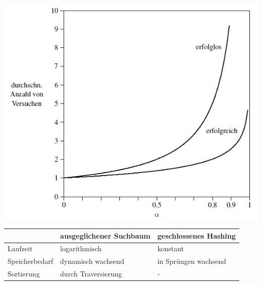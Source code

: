 \documentclass{beamer}
\begin{document}
\begin{frame}[fragile]
\includegraphics[scale=0.5]{bild4.png}  

\begin{tabular}{lll}
& ausgeglichener Suchbaum & geschlossenes Hashing  \\ 
\hline
Laufzeit  & logarithmisch & konstant \\ 
Speicherbedarf  & dynamisch wachsend & in Sprüngen wachsend \\
Sortierung & durch Traversierung &- \\
\hline
\end{tabular}
\end{frame}
 
\end{document}

